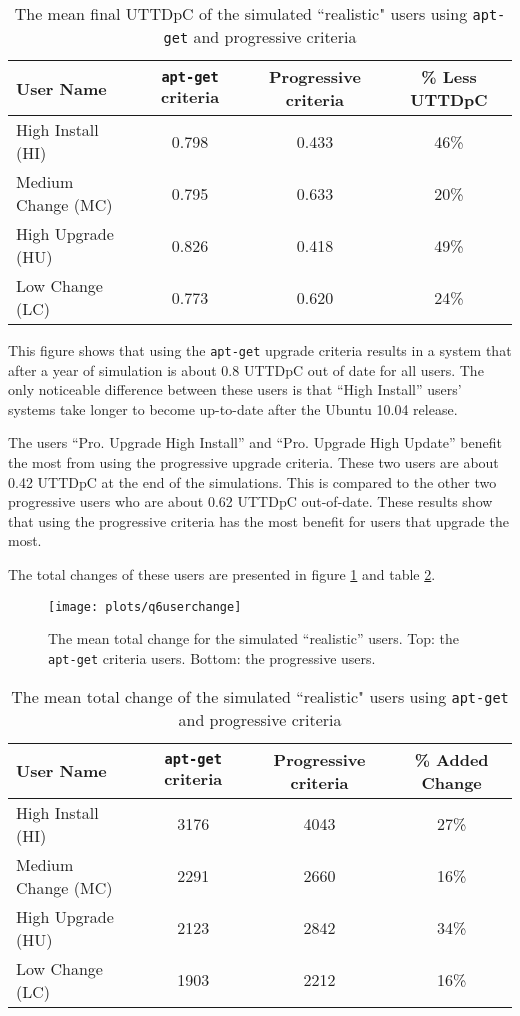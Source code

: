 \begin{table}[h!]
\centering
\begin{tabular}{|l | c | c | c | }
\hline
User Name 				& \texttt{apt-get} criteria & Progressive criteria 	& \% Less UTTDpC	\\ \hline
High Install (HI)			& 0.798				& 0.433 			& 46\%	\\
Medium Change (MC)			& 0.795				& 0.633 			& 20\% 	\\
High Upgrade (HU)			& 0.826				& 0.418				& 49\%  \\
Low Change 	(LC)			& 0.773				& 0.620 			& 24\%   \\ \hline
\end{tabular}
\caption{The mean final UTTDpC of the simulated ``realistic" users using \texttt{apt-get} and progressive criteria}
\label{exp.tblq6uttd}
\end{table}

This figure shows that using the \texttt{apt-get} upgrade criteria results in a system that after a year of simulation is about 0.8 UTTDpC out of date for all users. 
The only noticeable difference between these users is that ``High Install'' users' systems take longer to become up-to-date after the Ubuntu 10.04 release.


The users ``Pro. Upgrade High Install'' and ``Pro. Upgrade High Update'' benefit the most from using the progressive upgrade criteria.
These two users are about 0.42 UTTDpC at the end of the simulations.
This is compared to the other two progressive users who are about 0.62 UTTDpC out-of-date.
These results show that using the progressive criteria has the most benefit for users that upgrade the most.      

The total changes of these users are presented in figure \ref{exp.q6userchange} and table \ref{exp.tblq6change}.
\begin{figure}[htp]
\begin{center}
  \texttt{[image: plots/q6userchange]}
  \caption{The mean total change for the simulated ``realistic'' users.  Top: the \texttt{apt-get} criteria users. Bottom: the progressive users.}
  \label{exp.q6userchange}
\end{center}
\end{figure}

\begin{table}[h!]
\centering
\begin{tabular}{|l | c | c | c | }
\hline
User Name 				& \texttt{apt-get} criteria 		& Progressive criteria 	& \% Added Change	\\ \hline
High Install (HI)			& 3176			& 4043 	& 27\% 	\\
Medium Change (MC)			& 2291			& 2660 	& 16\% 	\\
High Upgrade (HU)			& 2123			& 2842	& 34\%   \\
Low Change 	(LC)			& 1903			& 2212 	& 16\%   \\ \hline
\end{tabular}
\caption{The mean total change of the simulated ``realistic" users using \texttt{apt-get} and progressive criteria}
\label{exp.tblq6change}
\end{table}

